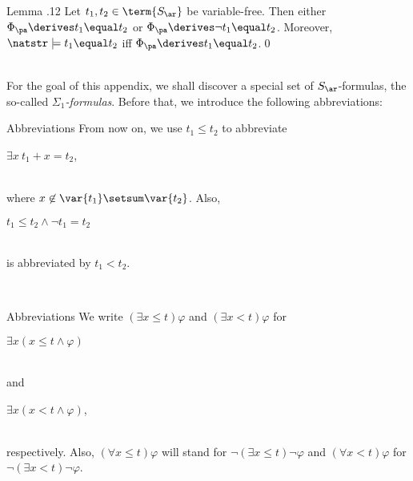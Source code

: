 \begin{theorem}{Lemma \thesection.12}
Let $t_1, t_2 \in \term{S_\ar}$ be variable-free. Then either $\Phi_\pa \derives t_1 \equal t_2$ or $\Phi_\pa \derives \neg t_1 \equal t_2$. Moreover, $\natstr \models t_1 \equal t_2$ \quad iff \quad $\Phi_\pa \derives t_1 \equal t_2$.\qed
\end{theorem}\ \bigskip\\
For the goal of this appendix, we shall discover a special set of $S_\ar$-formulas, the so-called \emph{$\Sigma_1$-formulas}. Before that, we introduce the following abbreviations:\medskip\\
\begin{definition}{Abbreviations}
From now on, we use $t_1 \leq t_2$ to abbreviate\\
\centerline{$\exists x \ t_1 + x \equal t_2$,}\\
where $x \not\in \var{t_1} \setsum \var{t_2}$. Also,\\
\centerline{$t_1 \leq t_2 \land \neg t_1 \equal t_2$ }\\
is abbreviated by $t_1 < t_2$.
\end{definition}\bigskip\\
\begin{definition}{Abbreviations}
We write $(\exists x \leq t) \varphi$ and $(\exists x < t) \varphi$ for\\
\centerline{$\exists x (x \leq t \land \varphi)$}\\
and\\
\centerline{$\exists x (x < t \land \varphi)$,}\\
respectively. Also, $(\forall x \leq t) \varphi$ will stand for $\neg(\exists x \leq t) \neg\varphi$ and $(\forall x < t) \varphi$ for $\neg(\exists x < t) \neg\varphi$.
\end{definition}\bigskip\\
